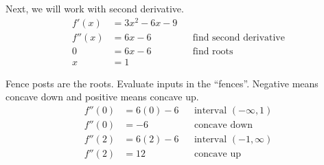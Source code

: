 \documentclass{article}
\begin{document}
\begin{description}
\begin{description}
                Next, we will work with second derivative.
                \begin{align*}
                  f'(x)  & = 3x^2-6x - 9                                    \\
                  f''(x) & = 6x - 6      &  & \text{find second derivative} \\[2em]
                  0      & = 6x - 6      &  & \text{find roots}             \\
                  x      & = 1
                \end{align*}

                Fence posts are the roots. Evaluate inputs in the ``fences''. Negative means concave
                down and positive means concave up.
                \begin{align*}
                  f''(0) & = 6(0) - 6  &  & \text{interval $(-\infty, 1)$} \\
                  f''(0) & = -6        &  & \text{concave down}            \\[2em]
                  f''(2) & =  6(2) - 6 &  & \text{interval $(-1, \infty)$} \\
                  f''(2) & = 12        &  & \text{concave up}
                \end{align*}


\end{description}
\end{description}
\end{document}
